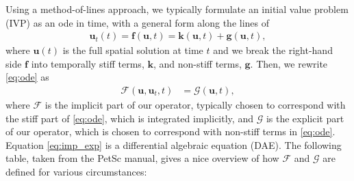 \documentclass[a4paper,12pt]{article}
\begin{document}
Using a method-of-lines approach, we typically formulate an initial value problem (IVP) as an ode in time,
with a general form along the lines of
\begin{align}
\mathbf{u}_t(t) = \mathbf{f}(\mathbf{u}, t) = \mathbf{k}(\mathbf{u},t) + \mathbf{g}(\mathbf{u},t), \label{eq:ode}
\end{align}
where $\mathbf{u}(t)$ is the full spatial solution at time $t$ and we break the right-hand side $\mathbf{f}$ into
temporally stiff terms, $\mathbf{k}$, and non-stiff terms, $\mathbf{g}$. Then, we rewrite \eqref{eq:ode} as
\begin{align}
\mathcal{F}(\mathbf{u},\mathbf{u}_t,t) & = \mathcal{G}(\mathbf{u},t),\label{eq:imp_exp}
\end{align}
where $\mathcal{F}$ is the implicit part of our operator, typically chosen to correspond with the stiff part of \eqref{eq:ode},
which is integrated implicitly, and $\mathcal{G}$ is the explicit part of our operator, which is chosen to correspond with non-stiff
terms in \eqref{eq:ode}. Equation \eqref{eq:imp_exp} is a differential algebraic equation (DAE). The following table, taken from the
PetSc manual, gives a nice overview of how $\mathcal{F}$ and $\mathcal{G}$ are defined for various circumstances: 
\end{document}

